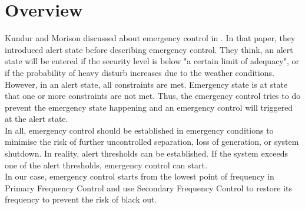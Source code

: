 \section{Overview} %

Kundur and Morison discussed about emergency control in . In that paper, they introduced alert state before describing emergency control. They think, \cite{kundur1997techniques} an alert state will be entered if the security level is below "a certain limit of adequacy", or if the probability of heavy disturb increases due to the weather conditions. However, in an alert state, all constraints are met. Emergency state is at state that one or more constraints are not met. Thus, the emergency control tries to do prevent the emergency state happening and an emergency control will triggered at the alert state.\\

In all, emergency control should be established in emergency conditions to minimise the risk of further uncontrolled separation, loss of generation, or system shutdown. In reality, \cite{kundur1997techniques} alert thresholds can be established. If the system exceeds one of the alert thresholds, emergency control can start.\\

In our case, emergency control starts from the lowest point of frequency in Primary Frequency Control and use Secondary Frequency Control to restore its frequency to prevent the risk of black out.